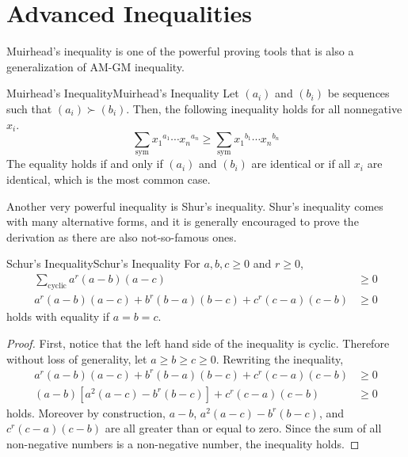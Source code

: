 \documentclass[../../main.tex]{subfiles}
\begin{document}
\section{Advanced Inequalities}




Muirhead's inequality is one of the powerful proving tools that is
also a generalization of AM-GM inequality.

\begin{theorem}{Muirhead's Inequality}{Muirhead's Inequality}
Let $(a_i)$ and $(b_i)$ be sequences such that $(a_i) \succ (b_i)$.
Then, the following inequality holds for all nonnegative $x_i$.
\[
\sum_\text{sym} {x_1}^{a_1} \cdots {x_n}^{a_n} 
\geq \sum_\text{sym} {x_1}^{b_1} \cdots {x_n}^{b_n}
\]
The equality holds if and only if $(a_i)$ and $(b_i)$ are identical
or if all $x_i$ are identical, which is the most common case.
\end{theorem}






Another very powerful inequality is Shur's inequality.
Shur's inequality comes with many alternative forms, and it is
generally encouraged to prove the derivation as there are also
not-so-famous ones.

\begin{theorem}{Schur's Inequality}{Schur's Inequality}
For $a, b, c \geq 0$ and $r \geq 0$,
\begin{align*}
    \sum_\text{cyclic} a^r(a - b)(a - c)
    &\geq 0 \\
    a^r(a - b)(a - c) + b^r(b - a)(b - c) + c^r(c - a)(c - b)
    &\geq 0
\end{align*}
holds with equality if $a = b = c$.
\end{theorem}
\begin{proof}
First, notice that the left hand side of the inequality is cyclic.
Therefore without loss of generality, let $a \geq b \geq c \geq 0$.
Rewriting the inequality,
\begin{align*}
    a^r(a - b)(a - c) + b^r(b - a)(b - c) + c^r(c - a)(c - b)
    &\geq 0 \\
    (a - b)\left[ a^2(a - c) - b^r(b - c) \right] + c^r(c - a)(c - b)
    &\geq 0
\end{align*}
holds. Moreover by construction, $a - b$, $a^2(a - c) - b^r(b - c)$,
and $c^r(c - a)(c - b)$ are all greater than or equal to zero.
Since the sum of all non-negative numbers is a non-negative number,
the inequality holds.
\end{proof}
\end{document}
